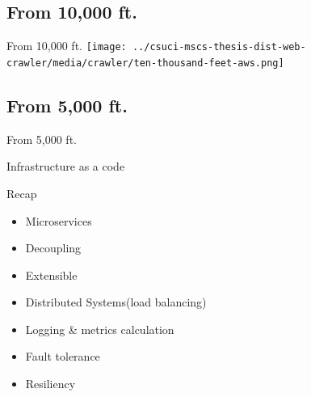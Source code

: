 \documentclass[9pt]{beamer}
\begin{document}

\subsection{From 10,000 ft.}
\begin{frame}{From 10,000 ft.}
 \centering
 \texttt{[image: ../csuci-mscs-thesis-dist-web-crawler/media/crawler/ten-thousand-feet-aws.png]} 
\end{frame}


\subsection{From 5,000 ft.}
\begin{frame}{From 5,000 ft.}
\end{frame}




\begin{frame}{Infrastructure as a code}
  \centering
\end{frame}


\begin{frame}{Recap}
  \begin{itemize}
  \item Microservices
  \item Decoupling
  \item Extensible
  \item Distributed Systems(load balancing)
  \item Logging \& metrics calculation
  \item Fault tolerance
  \item Resiliency
  \end{itemize}
\end{frame}
\end{document}
